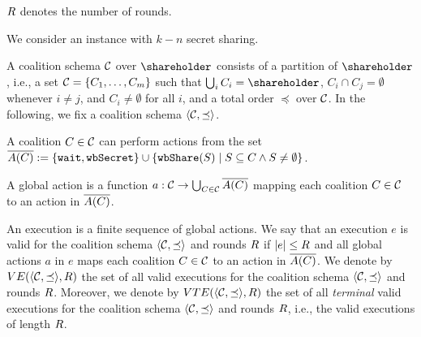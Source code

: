 %
$R$ denotes the number of rounds.

%
We consider an \shortname instance with $k-n$ secret sharing.

%
A coalition schema $\mathcal{C}$ over $\shareholder$ consists of a partition of $\shareholder$, i.e., a set $\mathcal{C} = \{ C_1, \ldots, C_m\}$ such that $\bigcup_{i}C_i = \shareholder$, $C_i \cap C_j = \emptyset$ whenever $i \neq j$, and $C_i \neq \emptyset$ for all $i$, and a total order $\preceq$ over $\mathcal{C}$.
%
In the following, we fix a coalition schema $\langle \mathcal{C},\preceq \rangle$.


%
A coalition $C \in \mathcal{C}$ can perform actions from the set $\overline{A(C)} := \{\mathtt{wait}, \mathtt{wbSecret} \} \cup \{ \mathtt{wbShare}(S) \mid S \subseteq C \wedge S \neq \emptyset\}$. %

%
A global action is a function $a: \mathcal{C} \to \bigcup_{C \in \mathcal{C}} \overline{A(C)}$ mapping each coalition $C \in \mathcal{C}$ to an action in $\overline{A(C)}$.

%
An execution is a finite sequence of global actions.
%
%
%
We say that an execution $e$ is valid for the coalition schema $\langle \mathcal{C},\preceq \rangle$ and rounds $R$ if $|e| \leq R$ and all global actions $a$ in $e$ maps each coalition $C \in \mathcal{C}$ to an action in $\overline{A(C)}$.
%
We denote by $VE(\langle \mathcal{C},\preceq \rangle,R)$ the set of all valid executions for the coalition schema $\langle \mathcal{C},\preceq \rangle$ and rounds $R$.
%
Moreover, we denote by $VTE(\langle \mathcal{C},\preceq \rangle,R)$ the set of all \textit{terminal} valid executions for the coalition schema $\langle \mathcal{C},\preceq \rangle$ and rounds $R$, i.e., the valid executions of length $R$.


